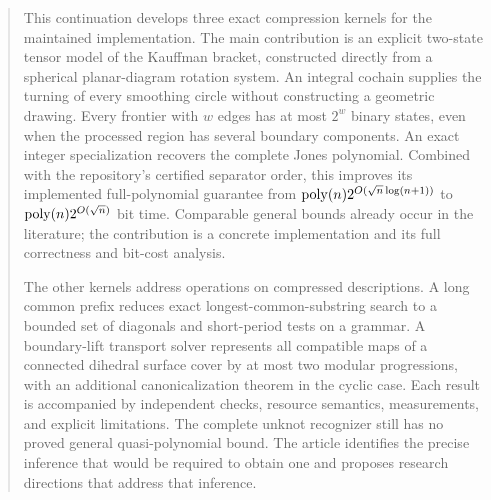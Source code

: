 \begin{abstract}
This continuation develops three exact compression kernels for the maintained
 implementation. The main contribution is an explicit
two-state tensor model of the Kauffman bracket, constructed directly from a
spherical planar-diagram rotation system. An integral cochain supplies the
turning of every smoothing circle without constructing a geometric drawing.
Every frontier with $w$ edges has at most $2^w$ binary states, even when the
processed region has several boundary components. An exact integer
specialization recovers the complete Jones polynomial. Combined with the
repository's certified separator order, this improves its implemented
full-polynomial guarantee from
$\poly(n)2^{O(\sqrt n\log(n+1))}$ to
$\poly(n)2^{O(\sqrt n)}$ bit time. Comparable general bounds already occur in
the literature; the contribution is a concrete implementation and its full
correctness and bit-cost analysis.

The other kernels address operations on compressed descriptions. A long
common prefix reduces exact longest-common-substring search to a bounded set
of diagonals and short-period tests on a grammar. A boundary-lift transport
solver represents all compatible maps of a connected dihedral surface cover
by at most two modular progressions, with an additional canonicalization
theorem in the cyclic case. Each result is accompanied by independent checks,
resource semantics, measurements, and explicit limitations. The complete
unknot recognizer still has no proved general quasi-polynomial bound. The
article identifies the precise inference that would be required to obtain
one and proposes research directions that address that inference.
\end{abstract}
